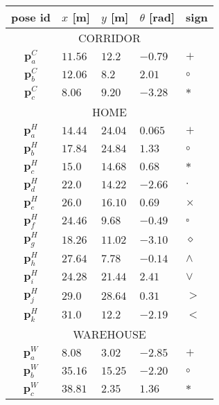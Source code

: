 \begin{table}\centering
  \begin{tabular} {c|llll} \midrule
    pose id & $x$ [m]   & $y$  [m]  & $\theta$ [rad]  &  sign            \\ \midrule
    \multicolumn{5}{c}{CORRIDOR}                                         \\ \midrule
    $\bm{p}_a^C$   & $11.56$   & $12.2$    & $-0.79$         & $+$       \\
    $\bm{p}_b^C$   & $12.06$   & $8.2$     & $2.01$          & $\circ$   \\
    $\bm{p}_c^C$   & $8.06$    & $9.20$    & $-3.28$         & $\ast$    \\ \midrule
    \multicolumn{5}{c}{HOME}                                             \\ \midrule
    $\bm{p}_a^H$   & $14.44$   & $24.04$   & $0.065$         & $+$       \\
    $\bm{p}_b^H$   & $17.84$   & $24.84$   & $1.33$          & $\circ$   \\
    $\bm{p}_c^H$   & $15.0$    & $14.68$   & $0.68$          & $\ast$    \\
    $\bm{p}_d^H$   & $22.0$    & $14.22$   & $-2.66$         & $\cdot$   \\
    $\bm{p}_e^H$   & $26.0$    & $16.10$   & $0.69$          & $\times$  \\
    $\bm{p}_f^H$   & $24.46$   & $9.68$    & $-0.49$         & $\square$ \\
    $\bm{p}_g^H$   & $18.26$   & $11.02$   & $-3.10$         & $\diamond$\\
    $\bm{p}_h^H$   & $27.64$   & $7.78$    & $-0.14$         & $\wedge$  \\
    $\bm{p}_i^H$   & $24.28$   & $21.44$   & $2.41$          & $\vee$    \\
    $\bm{p}_j^H$   & $29.0$    & $28.64$   & $0.31$          & $>$       \\
    $\bm{p}_k^H$   & $31.0$    & $12.2$    & $-2.19$         & $<$       \\ \midrule
    \multicolumn{5}{c}{WAREHOUSE}                                        \\ \midrule
    $\bm{p}_a^W$   & $8.08$    & $3.02$    & $-2.85$         & $+$       \\
    $\bm{p}_b^W$   & $35.16$   & $15.25$   & $-2.20$         & $\circ$   \\
    $\bm{p}_c^W$   & $38.81$   & $2.35$    & $1.36$          & $\ast$    \\

\end{tabular}
\end{table}
